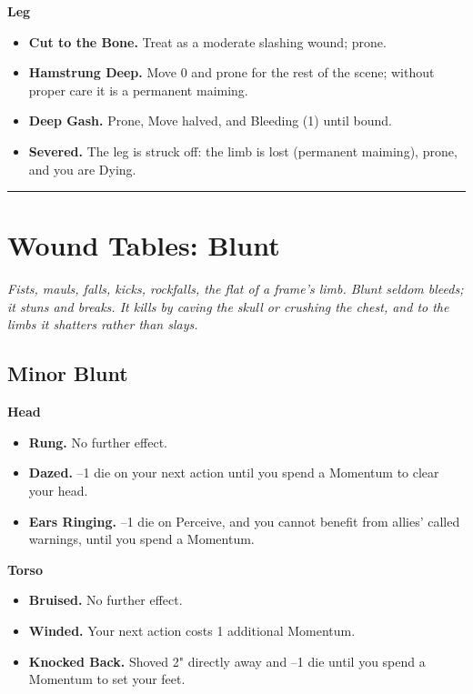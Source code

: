 \textbf{Leg}
\begin{itemize}
    \item[1] \textbf{Cut to the Bone.} Treat as a moderate slashing wound; prone.
    \item[2] \textbf{Hamstrung Deep.} Move 0 and prone for the rest of the scene; without proper care it is a permanent maiming.
    \item[3] \textbf{Deep Gash.} Prone, Move halved, and Bleeding (1) until bound.
    \item[4] \textbf{Severed.} The leg is struck off: the limb is lost (permanent maiming), prone, and you are Dying.
\end{itemize}

\medskip\hrule\medskip

\section{Wound Tables: Blunt}

\textit{Fists, mauls, falls, kicks, rockfalls, the flat of a frame's limb. Blunt seldom bleeds; it stuns and breaks. It kills by caving the skull or crushing the chest, and to the limbs it shatters rather than slays.}

\subsection{Minor Blunt}

\textbf{Head}
\begin{itemize}
    \item[1--2] \textbf{Rung.} No further effect.
    \item[3] \textbf{Dazed.} --1 die on your next action until you spend a Momentum to clear your head.
    \item[4] \textbf{Ears Ringing.} --1 die on Perceive, and you cannot benefit from allies' called warnings, until you spend a Momentum.
\end{itemize}

\textbf{Torso}
\begin{itemize}
    \item[1--2] \textbf{Bruised.} No further effect.
    \item[3] \textbf{Winded.} Your next action costs 1 additional Momentum.
    \item[4] \textbf{Knocked Back.} Shoved 2" directly away and --1 die until you spend a Momentum to set your feet.
\end{itemize}

